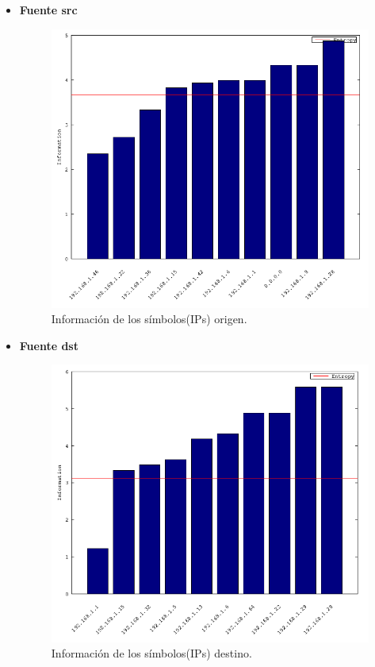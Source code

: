 \documentclass[10pt, a4paper]{article}
\begin{document}
\begin{itemize}
\item \textbf{Fuente src}

\begin{figure}[H] %
\begin{center}
\includegraphics[width=400pt]{../imgs/tiarg_src_chartbar.png}
\caption{Información de los símbolos(IPs) origen.}
\end{center}
\end{figure}

\item \textbf{Fuente dst}

%
\begin{figure}[H] %
\begin{center}
\includegraphics[width=400pt]{../imgs/tiarg_dst_chartbar.png}
\caption{Información de los símbolos(IPs) destino.}
\end{center}
\end{figure}

\end{itemize}
\end{document}
